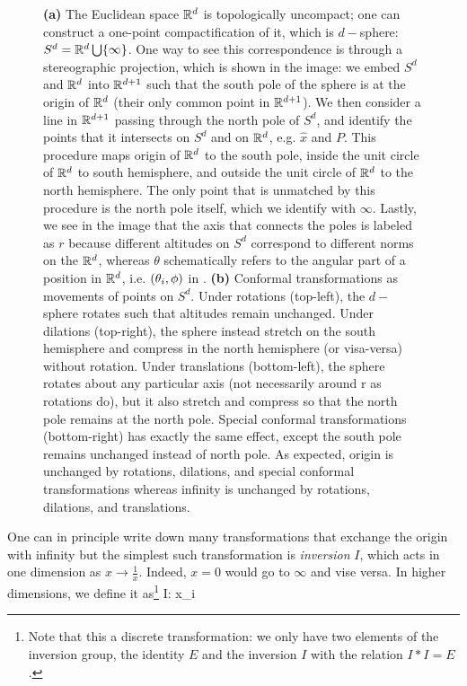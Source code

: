 \documentclass[12pt]{article}
\numberwithin{equation}{section}
\begin{document}
\begin{figure}
	\caption[Conformal transformations on $S^n$]{\label{fig: conformal transformations on Sn}\textbf{(a)} The Euclidean space $\mathbb{R}^d$ is topologically uncompact; one can construct a one-point compactification of it, which is $d-$sphere: $S^d=\mathbb{R}^d\bigcup\{\infty\}$. One way to see this correspondence is through a stereographic projection, which is shown in the image: we embed $S^d$ and $\mathbb{R}^d$ into $\mathbb{R}^{d+1}$ such that the south pole of the sphere is at the origin of $\mathbb{R}^d$ (their only common point in $\mathbb{R}^{d+1}$). We then consider a line in $\mathbb{R}^{d+1}$ passing through the north pole of $S^d$, and identify the points that it intersects on $S^d$ and on $\mathbb{R}^d$, e.g. $\hat{x}$ and $P$. This procedure maps origin of $\mathbb{R}^d$ to the south pole, inside the unit circle of $\mathbb{R}^d$ to south hemisphere, and outside the unit circle of $\mathbb{R}^d$ to the north hemisphere. The only point that is unmatched by this procedure is the north pole itself, which we identify with $\infty$. Lastly, we see in the image that the axis that connects the poles is labeled as $r$ because different altitudes on $S^d$ correspond to different norms on the $\mathbb{R}^d$, whereas $\theta$ schematically refers to the angular part of a position in $\mathbb{R}^d$, i.e. $(\theta_i,\phi)$ in . \textbf{(b)} Conformal transformations as movements of points on $S^d$. Under rotations (top-left), the $d-$sphere rotates such that altitudes remain unchanged. Under dilations (top-right), the sphere instead stretch on the south hemisphere and compress in the north hemisphere (or visa-versa) without rotation. Under translations (bottom-left), the sphere rotates about any particular axis (not necessarily around r as rotations do), but it also stretch and compress so that the north pole remains at the north pole. Special conformal transformations (bottom-right) has exactly the same effect, except the south pole remains unchanged instead of north pole. As expected, origin is unchanged by rotations, dilations, and special conformal transformations whereas infinity is unchanged by rotations, dilations, and translations.}
\end{figure}

One can in principle write down many transformations that exchange the origin with infinity but the simplest such transformation is \emph{inversion} $I$, which acts in one dimension as $x\rightarrow \frac{1}{x}$. Indeed, $x=0$ would go to $\infty$ and vise versa. In higher dimensions, we define it as\footnote{Note that this a discrete transformation: we only have two elements of the inversion group, the identity $E$ and the inversion $I$ with the relation $I*I=E$.}
\be 
I: x_i\rightarrow{}
\ee  
\end{document}
